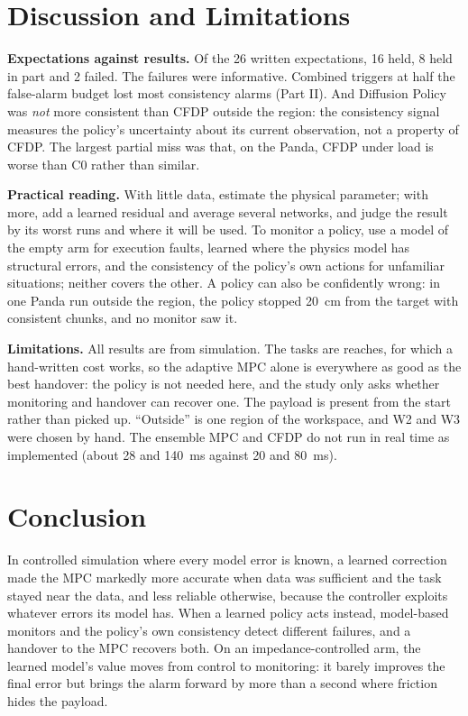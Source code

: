 \documentclass[conference]{IEEEtran}
\newcommand{\Cz}{C0}
\begin{document}
\section{Discussion and Limitations}

\textbf{Expectations against results.} Of the 26 written expectations, 16 held, 8 held in part and 2 failed. The failures were informative. Combined triggers at half the false-alarm budget lost most consistency alarms (Part II). And Diffusion Policy was \emph{not} more consistent than CFDP outside the region: the consistency signal measures the policy's uncertainty about its current observation, not a property of CFDP. The largest partial miss was that, on the Panda, CFDP under load is worse than \Cz{} rather than similar.

\textbf{Practical reading.} With little data, estimate the physical parameter; with more, add a learned residual and average several networks, and judge the result by its worst runs and where it will be used. To monitor a policy, use a model of the empty arm for execution faults, learned where the physics model has structural errors, and the consistency of the policy's own actions for unfamiliar situations; neither covers the other. A policy can also be confidently wrong: in one Panda run outside the region, the policy stopped \SI{20}{cm} from the target with consistent chunks, and no monitor saw it.

\textbf{Limitations.} All results are from simulation. The tasks are reaches, for which a hand-written cost works, so the adaptive MPC alone is everywhere as good as the best handover: the policy is not needed here, and the study only asks whether monitoring and handover can recover one. The payload is present from the start rather than picked up. ``Outside'' is one region of the workspace, and W2 and W3 were chosen by hand. The ensemble MPC and CFDP do not run in real time as implemented (about 28 and \SI{140}{ms} against 20 and \SI{80}{ms}).

\section{Conclusion}

In controlled simulation where every model error is known, a learned correction made the MPC markedly more accurate when data was sufficient and the task stayed near the data, and less reliable otherwise, because the controller exploits whatever errors its model has. When a learned policy acts instead, model-based monitors and the policy's own consistency detect different failures, and a handover to the MPC recovers both. On an impedance-controlled arm, the learned model's value moves from control to monitoring: it barely improves the final error but brings the alarm forward by more than a second where friction hides the payload.



\end{document}
